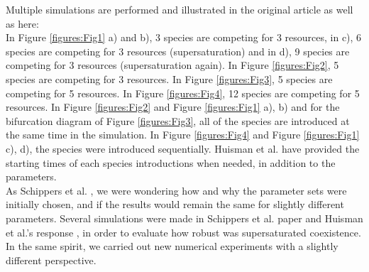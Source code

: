 Multiple simulations are performed and illustrated in the original article as well as here: \\
In Figure \ref{figures:Fig1} a) and b), 3 species are competing for 3 resources, in c), 6 species are competing for 3 resources (supersaturation) and in d), 9 species are competing for 3 resources (supersaturation again). In Figure \ref{figures:Fig2}, 5 species are competing for 3 resources. In Figure \ref{figures:Fig3}, 5 species are competing for 5 resources. In Figure \ref{figures:Fig4}, 12 species are competing for 5 resources. In Figure \ref{figures:Fig2} and Figure \ref{figures:Fig1} a), b) and for the bifurcation diagram of Figure \ref{figures:Fig3}, all of the species are introduced at the same time in the simulation. In Figure \ref{figures:Fig4} and Figure \ref{figures:Fig1} c), d), the species were introduced sequentially. Huisman et al. \cite{1999:Huisman} have provided the starting times of each species introductions when needed, in addition to the parameters.\\


As Schippers et al. \cite{2008:Schippers}, we were wondering how and why the parameter sets were initially chosen, and if the results would remain the same for slightly different parameters. Several simulations were made in Schippers et al. paper \cite{2008:Schippers} and Huisman et al.'s response \cite{2008:Huisman}, in order to evaluate how robust was supersaturated coexistence. In the same spirit, we carried out new numerical experiments with a slightly different perspective.\\

